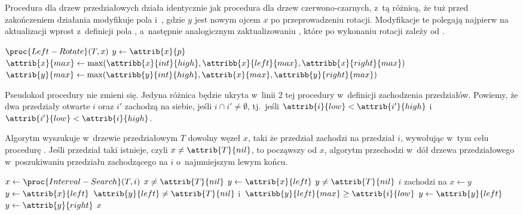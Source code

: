 
\exercise %
Procedura  dla drzew przedziałowych działa identycznie jak procedura  dla drzew czerwono-czarnych, z~tą różnicą, że tuż przed zakończeniem działania modyfikuje pola  i~, gdzie $y$ jest nowym ojcem $x$ po przeprowadzeniu rotacji.
Modyfikacje te polegają najpierw na aktualizacji  wprost z~definicji pola , a~następnie analogicznym zaktualizowaniu , które po wykonaniu rotacji zależy od .
\begin{codebox}
\li	$\proc{Left-Rotate}(T,x)$
\li	$y\gets\attrib{x}{p}$
\li	$\attrib{x}{max}\gets\max(\attribb{x}{int}{high},\attribb{x}{left}{max},\attribb{x}{right}{max})$
\li	$\attrib{y}{max}\gets\max(\attribb{y}{int}{high},\attrib{x}{max},\attribb{y}{right}{max})$
\end{codebox}

\exercise %
Pseudokod procedury  nie zmieni się.
Jedyna różnica będzie ukryta w~linii 2 tej procedury w~definicji zachodzenia przedziałów.
Powiemy, że dwa przedziały otwarte $i$ oraz $i'$ zachodzą na siebie, jeśli $i\cap i'\ne\emptyset$, tj.\ jeśli $\attrib{i}{low}<\attrib{i'}{high}$ i~$\attrib{i'}{low}<\attrib{i}{high}$.

\exercise %
Algorytm wyszukuje w~drzewie przedziałowym $T$ dowolny węzeł $x$, taki że przedział  zachodzi na przedział $i$, wywołując w~tym celu procedurę .
Jeśli przedział taki istnieje, czyli $x\ne\attrib{T}{nil}$, to począwszy od $x$, algorytm przechodzi w~dół drzewa przedziałowego w~poszukiwaniu przedziału zachodzącego na $i$ o~najmniejszym lewym końcu.
\begin{codebox}
\li $x\gets\proc{Interval-Search}(T,i)$
\li \If $x\ne\attrib{T}{nil}$
\li 	\Then $y\gets\attrib{x}{left}$
\li			\While $y\ne\attrib{T}{nil}$ \label{li:min-interval-search-while-begin}
\li				\Do \If $i$ zachodzi na  \label{li:min-interval-search-overlap-test}
\li						\Then $x\gets y$
\li							$y\gets\attrib{x}{left}$ \label{li:min-interval-search-y-modification}
\li						\Else \If $\attrib{y}{left}\ne\attrib{T}{nil}$ i~$\attribb{y}{left}{max}\ge\attrib{i}{low}$ \label{li:min-interval-search-no-overlap-begin}
\li							\Then $y\gets\attrib{y}{left}$
\li							\Else $y\gets\attrib{y}{right}$
							\End \label{li:min-interval-search-no-overlap-end}
						\End
				\End \label{li:min-interval-search-while-end}
		\End
\li	\Return $x$
\end{codebox}

